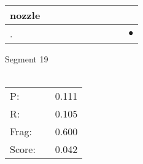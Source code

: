 \documentclass[landscape]{article}
\newcommand{\ssp}{\hspace{2pt}}
\newcommand{\mex}{\cellcolor{g}$\bullet$}
\begin{document}
\begin{tabular}{|l|p{10pt}|p{10pt}|p{10pt}|p{10pt}|p{10pt}|p{10pt}|p{10pt}|p{10pt}|p{10pt}|}
\hline
\ssp nozzle \ssp&\hspace{2pt}&\hspace{2pt}&\hspace{2pt}&\hspace{2pt}&\hspace{2pt}&\hspace{2pt}&\hspace{2pt}&\hspace{2pt}&\hspace{2pt}\\
\hline
\ssp \cellcolor{ref8}. \ssp&\hspace{2pt}&\hspace{2pt}&\hspace{2pt}&\hspace{2pt}&\hspace{2pt}&\hspace{2pt}&\hspace{2pt}&\hspace{2pt}&\hspace{2pt}\mex\\
\hline
\end{tabular}

\vspace{6pt}
\noindent Segment 19\\\\
\noindent\begin{tabular}{lm{12pt}r}
\hline
P:&&0.111\\
R:&&0.105\\
Frag:&&0.600\\
Score:&&0.042\\
\end{tabular}

\newpage
\end{document}
